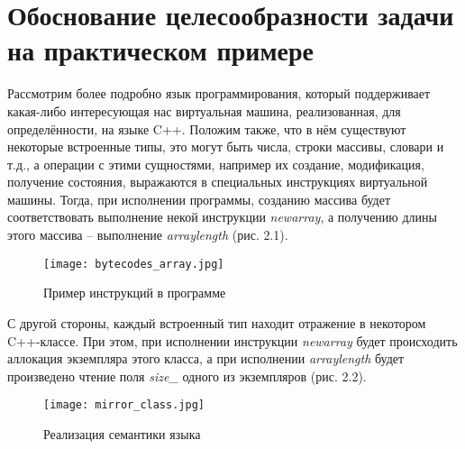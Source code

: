 \section{Обоснование целесообразности задачи на практическом примере}
Рассмотрим более подробно язык программирования, который поддерживает какая-либо интересующая нас виртуальная машина, реализованная, для определённости, на языке C++.
Положим также, что в нём существуют некоторые встроенные типы, это могут быть числа, строки массивы, словари и т.д., а операции с этими сущностями, например их создание, модификация, получение состояния, выражаются в специальных инструкциях виртуальной машины.
Тогда, при исполнении программы, созданию массива будет соответствовать выполнение некой инструкции \textit{newarray}, а получению длины этого массива -- выполнение \textit{arraylength} (рис. 2.1).

\begin{figure}[H]
    \centering
    \texttt{[image: bytecodes\_array.jpg]}
    \caption{Пример инструкций в программе}
\end{figure}

С другой стороны, каждый встроенный тип находит отражение в некотором C++-классе. При этом, при исполнении инструкции \textit{newarray} будет происходить аллокация экземпляра этого класса, а при исполнении \textit{arraylength} будет произведено чтение поля \textit{size\_} одного из экземпляров (рис. 2.2).

\begin{figure}[H]
    \centering
    \texttt{[image: mirror\_class.jpg]}
    \caption{Реализация семантики языка}
\end{figure}

